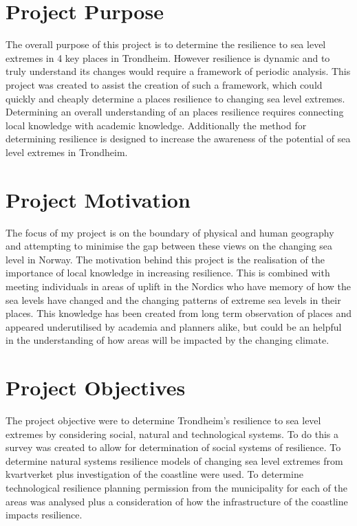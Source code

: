 \paragraph{}

\section{Project Purpose}
The overall purpose of this project is to determine the resilience to sea level extremes in 4 key places in Trondheim. However resilience is dynamic and to truly understand its changes would require a framework of periodic analysis. This project was created to assist the creation of such a framework, which could quickly and cheaply determine a places resilience to changing sea level extremes. Determining an overall understanding of an places resilience requires connecting local knowledge with academic knowledge. Additionally the method for determining resilience is designed to increase the awareness of the potential of sea level extremes in Trondheim. 

\section{Project Motivation}
 The focus of my project is on the boundary of physical and human geography and attempting to minimise the gap between these views on the changing sea level in Norway. The motivation behind this project is the realisation of the importance of local knowledge in increasing resilience. This is combined with meeting individuals in areas of uplift in the Nordics who have memory of how the sea levels have changed and the changing patterns of extreme sea levels in their places. This knowledge has been created from long term observation of places and appeared underutilised by academia and planners alike, but could be an helpful in the understanding of how areas will be impacted by the changing climate. 

\section{Project Objectives}
The project objective were to determine Trondheim's resilience to sea level extremes by considering social, natural and technological systems. To do this a survey was created to allow for determination of social systems of resilience. To determine natural systems resilience models of changing sea level extremes from kvartverket plus investigation of the coastline were used. To determine technological resilience planning permission from the municipality for each of the areas was analysed plus a consideration of how the infrastructure of the coastline impacts resilience.

